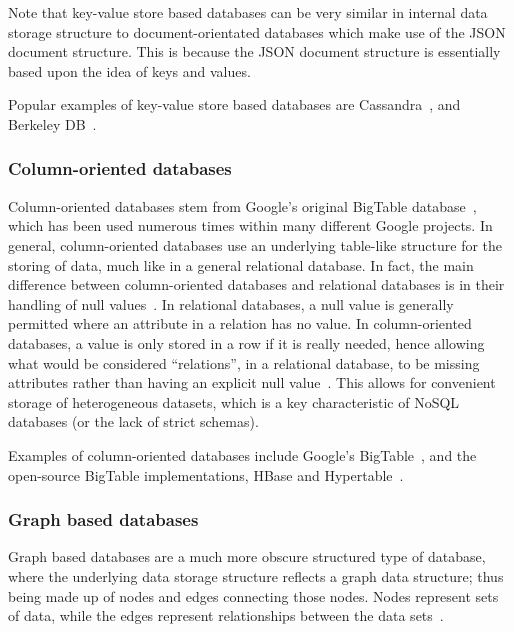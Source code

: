\documentclass{article}
\begin{document}
Note that key-value store based databases can be very similar in internal data storage structure to 
document-orientated databases which make use of the JSON document structure. This is because the JSON
document structure is essentially based upon the idea of keys and values.

Popular examples of key-value store based databases are Cassandra~\cite{3_cassandra.apache.org_2015},
and Berkeley DB~\cite{4_oracle.com_2015}.


\subsubsection{Column-oriented databases} %
\label{ssub:column_oriented}

Column-oriented databases stem from Google's original BigTable database~\cite{chang2008bigtable}, which
has been used numerous times within many different Google projects. In general, column-oriented databases
use an underlying table-like structure for the storing of data, much like in a general relational
database. In fact, the main difference between column-oriented databases and relational databases
is in their handling of null values~\cite{hecht2011nosql}. In relational databases, a null value
is generally permitted where an attribute in a relation has no value. In column-oriented databases,
a value is only stored in a row if it is really needed, hence allowing what would be considered
``relations'', in a relational database, to be missing attributes rather than having an explicit
null value~\cite{hecht2011nosql}. This allows for convenient storage of heterogeneous datasets,
which is a key characteristic of NoSQL databases (or the lack of strict schemas).

Examples of column-oriented databases include Google's BigTable~\cite{chang2008bigtable}, and 
the open-source BigTable implementations, HBase and Hypertable~\cite{khetrapal2006hbase}.

\subsubsection{Graph based databases} %
\label{ssub:graph_based}

Graph based databases are a much more obscure structured type of database, where the underlying 
data storage structure reflects a graph data structure; thus being made up of nodes and edges
connecting those nodes. Nodes represent sets of data, while the edges represent relationships
between the data sets~\cite{vicknair2010comparison}.
\end{document}
